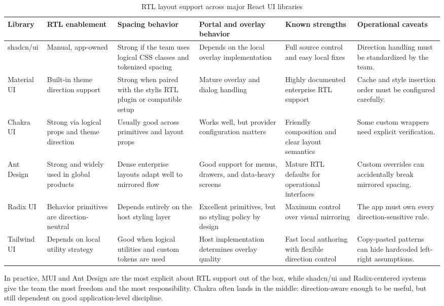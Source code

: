 \begin{table}[htbp]
  \centering
  \caption{RTL layout support across major React UI libraries}
  \begin{tabularx}{\textwidth}{@{}p{}p{}p{}p{}p{}Y@{}}
    \toprule
    \textbf{Library} & \textbf{RTL enablement} & \textbf{Spacing behavior} & \textbf{Portal and overlay behavior} & \textbf{Known strengths} & \textbf{Operational caveats} \\
    \midrule
    shadcn/ui & Manual, app-owned & Strong if the team uses logical CSS classes and tokenized spacing & Depends on the local overlay implementation & Full source control and easy local fixes & Direction handling must be standardized by the team. \\
    Material UI & Built-in theme direction support & Strong when paired with the stylis RTL plugin or compatible setup & Mature overlay and dialog handling & Highly documented enterprise RTL support & Cache and style insertion order must be configured carefully. \\
    Chakra UI & Strong via logical props and theme direction & Usually good across primitives and layout props & Works well, but provider configuration matters & Friendly composition and clear layout semantics & Some custom wrappers need explicit verification. \\
    Ant Design & Strong and widely used in global products & Dense enterprise layouts adapt well to mirrored flow & Good support for menus, drawers, and data-heavy screens & Mature RTL defaults for operational interfaces & Custom overrides can accidentally break mirrored spacing. \\
    Radix UI & Behavior primitives are direction-neutral & Depends entirely on the host styling layer & Excellent primitives, but no styling policy by design & Maximum control over visual mirroring & The app must own every direction-sensitive rule. \\
    Tailwind UI & Depends on local utility strategy & Good when logical utilities and custom tokens are used & Host implementation determines overlay quality & Fast local authoring with flexible direction control & Copy-pasted patterns can hide hardcoded left-right assumptions. \\
    \bottomrule
  \end{tabularx}
\end{table}

In practice, MUI and Ant Design are the most explicit about RTL support out of the box, while shadcn/ui and Radix-centered systems give the team the most freedom and the most responsibility. Chakra often lands in the middle: direction-aware enough to be useful, but still dependent on good application-level discipline.


